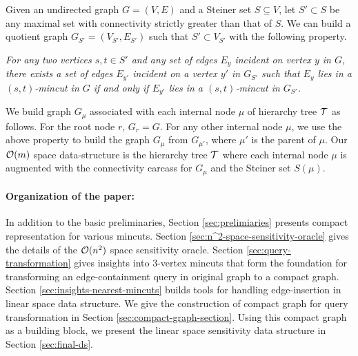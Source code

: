 Given an undirected graph $G=(V,E)$ and a Steiner set $S\subseteq V$, let $S'\subset S$ be any maximal set with connectivity strictly greater than that of $S$. We can build a quotient graph $G_{S'}=(V_{S'},E_{S'})$ such that $S' \subset V_{S'}$ with the following property.

{\em
For any two vertices $s,t \in S'$ and any set of edges $E_y$ incident on vertex $y$ in $G$, there exists a set of edges $E_{y'}$ incident on a vertex $y'$ in $G_{S'}$ such that $E_y$ lies in a $(s,t)$-mincut in $G$ if and only if $E_{y'}$ lies in a $(s,t)$-mincut in $G_{S'}$. 
}

We build graph $G_\mu$ associated with each internal node $\mu$ of hierarchy tree ${\cal T}$ as follows. For the root node $r$, $G_r = G$. For any other internal node $\mu$, we use the above property to build the graph $G_{\mu}$ from $G_{\mu'}$, where $\mu'$ is the parent of $\mu$. 
Our ${\cal O}(m)$ space data-structure is the hierarchy tree ${\cal T}$ where each internal node $\mu$ is augmented with the connectivity carcass for $G_\mu$ and the Steiner set $S(\mu)$.

\paragraph{Organization of the paper:}

In addition to the basic preliminaries, Section \ref{sec:prelimiaries} presents compact representation for various mincuts. Section \ref{sec:n^2-space-sensitivity-oracle} gives the details of the ${\cal O}(n^2)$ space sensitivity oracle. Section \ref{sec:query-transformation} gives insights into $3$-vertex mincuts that form the foundation for transforming an edge-containment query in original graph to a compact graph. Section \ref{sec:insights-nearest-mincuts} builds tools for handling edge-insertion in linear space data structure. We give the construction of compact graph for query transformation in Section \ref{sec:compact-graph-section}. Using this compact graph as a building block, we present the linear space sensitivity data structure in Section \ref{sec:final-ds}.